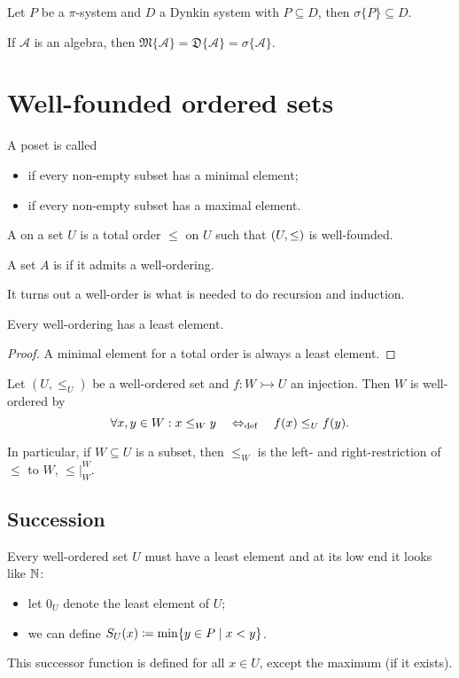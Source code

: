 \begin{corollary} \label{piLambdaTheorem}
Let $P$ be a $\pi$-system and $D$ a Dynkin system with $P\subseteq D$, then $\sigma\{P\} \subseteq D$.
\end{corollary}
\begin{corollary}
If $\mathcal{A}$ is an algebra, then $\mathfrak{M}\{\mathcal{A}\} = \mathfrak{D}\{\mathcal{A}\} = \sigma\{\mathcal{A}\}$.
\end{corollary}




\chapter{Well-founded ordered sets}
\begin{definition}
A poset is called
\begin{itemize}
\item {} if every non-empty subset has a minimal element;
\item {} if every non-empty subset has a maximal element.
\end{itemize}

A  on a set $U$ is a total order $\leq$ on $U$ such that $\left( U,\leq \right)$ is well-founded.

A set $A$ is  if it admits a well-ordering.
\end{definition}
It turns out a well-order is what is needed to do recursion and induction.

\begin{lemma}
Every well-ordering has a least element.
\end{lemma}
\begin{proof}
A minimal element for a total order is always a least element.
\end{proof}

\begin{lemma} \label{wellOrderingSubsets}
Let $(U,\leq_U)$ be a well-ordered set and $f: W \rightarrowtail U$ an injection. Then $W$ is well-ordered by
\[ \forall x,y\in W: x\leq_W y \quad\Leftrightarrow_{\text{def}}\quad f(x) \leq_U f(y). \]


In particular, if $W\subseteq U$ is a subset, then $\leq_W$ is the left- and right-restriction of $\leq$ to $W$, $\leq|_W^W$.
\end{lemma}

\section{Succession}
Every well-ordered set $U$ must have a least element and at its low end it looks like $\mathbb{N}$:
\begin{itemize}
\item let $0_U$ denote the least element of $U$;
\item we can define $S_U(x) \coloneqq \min\{y\in P\;|\;x<y\}$.
\end{itemize}
This successor function is defined for all $x\in U$, except the maximum (if it exists).

